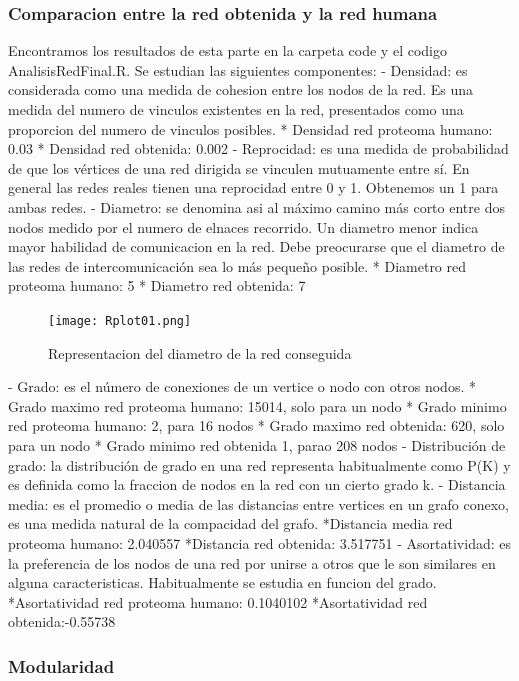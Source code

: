 \subsubsection{Comparacion entre la red obtenida y la red humana}
Encontramos los resultados de esta parte en la carpeta code y el codigo AnalisisRedFinal.R. Se estudian las siguientes componentes:
- Densidad: es considerada como una medida de cohesion entre los nodos de la red. Es una medida del numero de vinculos existentes en la red, presentados como una proporcion del numero de vinculos posibles. 
  * Densidad red proteoma humano: 0.03
  * Densidad red obtenida: 0.002
- Reprocidad: es una medida de probabilidad de que los vértices de una red dirigida se vinculen mutuamente entre sí. En general las redes reales tienen una reprocidad entre 0 y 1. Obtenemos un 1 para ambas redes.
- Diametro: se denomina asi al máximo camino más corto entre dos nodos medido por el numero de elnaces recorrido. Un diametro menor indica mayor habilidad de comunicacion en la red. Debe preocurarse que el diametro de las redes de intercomunicación sea lo más pequeño posible. 
  * Diametro red proteoma humano: 5
  * Diametro red obtenida: 7
  
  \begin{figure}[ht!]
	\centering
	\texttt{[image: Rplot01.png]}
	\caption{Representacion del diametro de la red conseguida}
\end{figure}

- Grado: es el número de conexiones de un vertice o nodo con otros nodos. 
  * Grado maximo red proteoma humano: 15014, solo para un nodo
  * Grado minimo red proteoma humano: 2, para 16 nodos
  * Grado maximo red obtenida: 620, solo para un nodo
  * Grado minimo red obtenida 1, parao 208 nodos
- Distribución de grado: la distribución de grado en una red representa habitualmente como P(K) y es definida como la fraccion de nodos en la red con un cierto grado k. 
- Distancia media: es el promedio o media de las distancias entre vertices en un grafo conexo, es una medida natural de la compacidad del grafo. 
  *Distancia media red proteoma humano: 2.040557
  *Distancia red obtenida: 3.517751
- Asortatividad: es la preferencia de los nodos de una red por unirse a otros que le son similares en alguna caracteristicas. Habitualmente se estudia en funcion del grado.
  *Asortatividad red proteoma humano: 0.1040102
  *Asortatividad red obtenida:-0.55738

\subsubsection{Modularidad}

